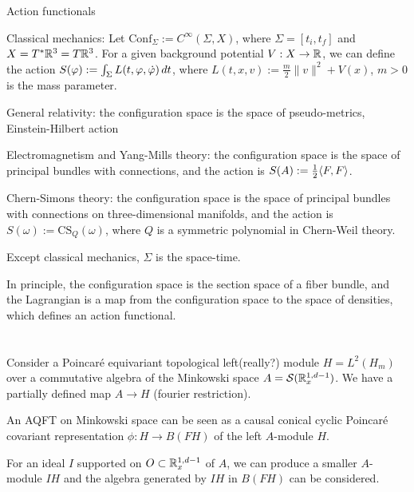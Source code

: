\documentclass{../../large}
\begin{document}
\begin{prb}
Action functionals
\begin{parts}
\item Classical mechanics: Let $\mathrm{Conf}_\Sigma:=C^\infty(\Sigma,X)$, where $\Sigma=[t_i,t_f]$ and $X=T^*\mathbb{R}^3=T\mathbb{R}^3$. For a given background potential $V:X\to\mathbb{R}$, we can define the action $S(\varphi):=\int_\Sigma L(t,\varphi,\dot{\varphi})\,dt$, where $L(t,x,v):=\frac m2\|v\|^2+V(x)$, $m>0$ is the mass parameter.
\item General relativity: the configuration space is the space of pseudo-metrics, Einstein-Hilbert action
\item Electromagnetism and Yang-Mills theory: the configuration space is the space of principal bundles with connections, and the action is $S(A):=\frac12\langle F,F\rangle$.
\item Chern-Simons theory: the configuration space is the space of principal bundles with connections on three-dimensional manifolds, and the action is $S(\omega):=\mathrm{CS}_Q(\omega)$, where $Q$ is a symmetric polynomial in Chern-Weil theory.
\end{parts}
Except classical mechanics, $\Sigma$ is the space-time.

In principle, the configuration space is the section space of a fiber bundle, and the Lagrangian is a map from the configuration space to the space of densities, which defines an action functional.
\end{prb}


\section{}

Consider a Poincar\'e equivariant topological left(really?) module $H=L^2(H_m)$ over a commutative algebra of the Minkowski space $A=\mathcal{S}(\mathbb{R}_x^{1,d-1})$.
We have a partially defined map $A\to H$ (fourier restriction).


An AQFT on Minkowski space can be seen as a causal conical cyclic Poincar\'e covariant representation $\phi:H\to B(FH)$ of the left $A$-module $H$.

For an ideal $I$ supported on $O\subset\mathbb{R}_x^{1,d-1}$ of $A$, we can produce a smaller $A$-module $IH$ and the algebra generated by $IH$ in $B(FH)$ can be considered.
\end{document}
